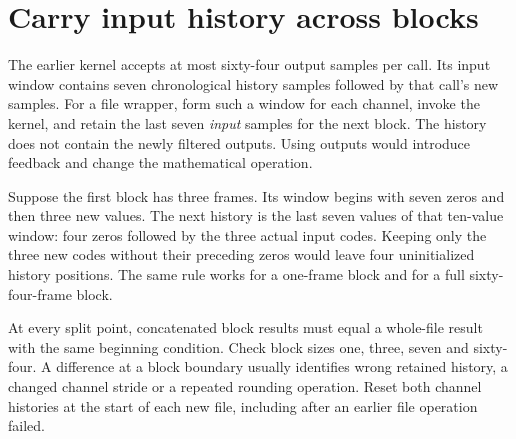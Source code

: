 \section{Carry input history across blocks}
The earlier kernel accepts at most sixty-four output samples per call. Its input window
contains seven chronological history samples followed by that call's new samples.
For a file wrapper, form such a window for each channel, invoke the kernel, and retain
the last seven \emph{input} samples for the next block. The history does not contain
the newly filtered outputs. Using outputs would introduce feedback and change the
mathematical operation.

Suppose the first block has three frames. Its window begins with seven zeros and then
three new values. The next history is the last seven values of that ten-value window:
four zeros followed by the three actual input codes. Keeping only the three new codes
without their preceding zeros would leave four uninitialized history positions. The
same rule works for a one-frame block and for a full sixty-four-frame block.

At every split point, concatenated block results must equal a whole-file result with
the same beginning condition. Check block sizes one, three, seven and sixty-four.
A difference at a block boundary usually identifies wrong retained history, a changed
channel stride or a repeated rounding operation. Reset both channel histories at the
start of each new file, including after an earlier file operation failed.
